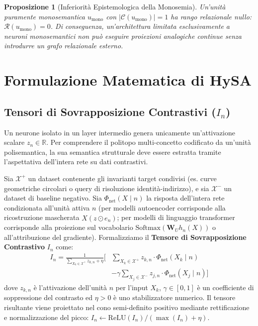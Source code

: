 \documentclass[11pt,a4paper]{article}
\newtheorem{proposizione}{Proposizione}
\theoremstyle{definition}
\begin{document}
\begin{proposizione}[Inferiorit\`a Epistemologica della Monosemia]
Un'unità puramente monosemantica $u_{\mathrm{mono}}$ con $|\mathcal{C}(u_{\mathrm{mono}})| = 1$ ha rango relazionale nullo: $\mathcal{R}(u_{\mathrm{mono}}) = 0$. Di conseguenza, un'architettura limitata esclusivamente a neuroni monosemantici non può eseguire proiezioni analogiche continue senza introdurre un grafo relazionale esterno.
\end{proposizione}

\section{Formulazione Matematica di HySA}

\subsection{Tensori di Sovrapposizione Contrastivi (\texorpdfstring{$I_n$}{In})}
Un neurone isolato in un layer intermedio genera unicamente un'attivazione scalare $z_n \in \mathbb{R}$. Per comprendere il politopo multi-concetto codificato da un'unità polisemantica, la sua semantica strutturale deve essere estratta tramite l'aspettativa dell'intera rete su dati contrastivi.

Sia $\mathcal{X}^+$ un dataset contenente gli invarianti target condivisi (es. curve geometriche circolari o query di risoluzione identità-indirizzo), e sia $\mathcal{X}^-$ un dataset di baseline negativo. Sia $\Phi_{\mathrm{net}}(X \mid n)$ la risposta dell'intera rete condizionata all'unità attiva $n$ (per modelli autoencoder corrisponde alla ricostruzione mascherata $\hat{X}(z \odot e_n)$; per modelli di linguaggio transformer corrisponde alla proiezione sul vocabolario $\mathrm{Softmax}(\mathbf{W}_U h_n(X))$ o all'attribuzione del gradiente). Formalizziamo il \textbf{Tensore di Sovrapposizione Contrastivo} $I_n$ come:
\begin{equation}
\begin{aligned}
    I_n = \frac{1}{\sum_{X_k \in \mathcal{X}^+} z_{k,n} + \eta} \Bigg[ & \sum_{X_k \in \mathcal{X}^+} z_{k,n} \cdot \Phi_{\mathrm{net}}(X_k \mid n) \\
    & - \gamma \sum_{X_j \in \mathcal{X}^-} z_{j,n} \cdot \Phi_{\mathrm{net}}(X_j \mid n) \Bigg]
\end{aligned}
\label{eq:imprinted_tensor}
\end{equation}
dove $z_{k,n}$ è l'attivazione dell'unità $n$ per l'input $X_k$, $\gamma \in [0, 1]$ è un coefficiente di soppressione del contrasto ed $\eta > 0$ è uno stabilizzatore numerico. Il tensore risultante viene proiettato nel cono semi-definito positivo mediante rettificazione e normalizzazione del picco: $I_n \leftarrow \mathrm{ReLU}(I_n) / (\max(I_n) + \eta)$.
\end{document}
